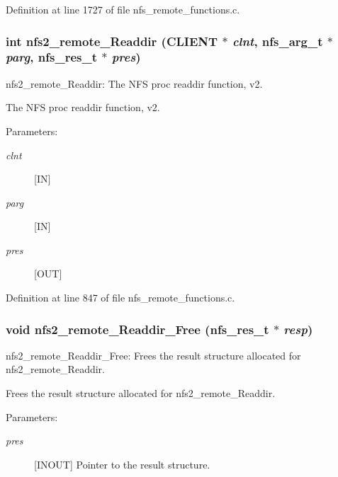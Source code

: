 Definition at line 1727 of file nfs\_\-remote\_\-functions.c.
\subsubsection[{nfs2\_\-remote\_\-Readdir}]{\setlength{\rightskip}{0pt plus 5cm}int nfs2\_\-remote\_\-Readdir (CLIENT $\ast$ {\em clnt}, \/  nfs\_\-arg\_\-t $\ast$ {\em parg}, \/  nfs\_\-res\_\-t $\ast$ {\em pres})}\label{group__NFSprocs_g8f704898b265261eeeef2d62957bb2d8}


nfs2\_\-remote\_\-Readdir: The NFS proc readdir function, v2.

The NFS proc readdir function, v2.

\begin{Desc}
\item[Parameters:]
\begin{description}
\item[{\em clnt}][IN] \item[{\em parg}][IN] \item[{\em pres}][OUT] \end{description}
\end{Desc}


Definition at line 847 of file nfs\_\-remote\_\-functions.c.
\subsubsection[{nfs2\_\-remote\_\-Readdir\_\-Free}]{\setlength{\rightskip}{0pt plus 5cm}void nfs2\_\-remote\_\-Readdir\_\-Free (nfs\_\-res\_\-t $\ast$ {\em resp})}\label{group__NFSprocs_gd4cf54990950404722b215986f68703f}


nfs2\_\-remote\_\-Readdir\_\-Free: Frees the result structure allocated for nfs2\_\-remote\_\-Readdir.

Frees the result structure allocated for nfs2\_\-remote\_\-Readdir.

\begin{Desc}
\item[Parameters:]
\begin{description}
\item[{\em pres}][INOUT] Pointer to the result structure. \end{description}
\end{Desc}


